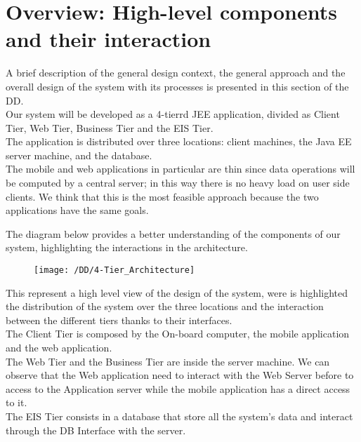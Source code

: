  \section{Overview: High-level components and their interaction}
A brief description of the general design context, the general approach and the overall design of the system with its processes is presented in this section of the DD.
\\Our system will be developed as a 4-tierrd JEE application, divided as Client Tier, Web Tier, Business Tier and the EIS Tier. %
\\The application is distributed over three locations: client machines, the Java EE server machine, and the database.
\\The mobile and web applications in particular are thin since data operations will be computed by a central server; in this way there is no heavy load on user side clients. We think that this is the most feasible approach because the two applications have the same goals. 


The diagram below provides a better understanding of the components of our system, highlighting the interactions in the architecture.
\begin{figure}[!h]
  \centering
  \vspace{0.2cm}
  \texttt{[image: /DD/4-Tier\_Architecture]}\\%
  \vspace{0.4cm}
  \label{fig:4-Tier_Architecture} 
\end{figure}

This represent a high level view of the design of the system, were is highlighted the distribution of the system over the three locations and the interaction between the different tiers thanks to their interfaces.
\\The Client Tier is composed by the On-board computer, the mobile application and the web application.
\\The Web Tier and the Business Tier are inside the server machine. We can observe that the Web application need to interact with the Web Server before to access to the Application server while the mobile application has a direct access to it.
\\The EIS Tier consists in a database that store all the system's data and interact through the DB Interface with the server.

